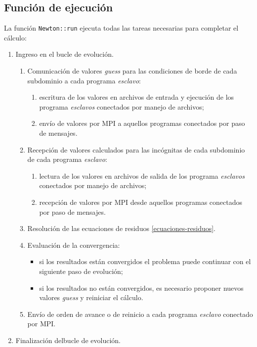 \subsection*{Función de ejecución}
\label{ap2:newton-run}

La función \texttt{Newton::run} ejecuta todas las tareas necesarias para completar el cálculo:
\begin{enumerate}
\item Ingreso en el bucle de evolución.
  \begin{enumerate}
  \item Comunicación de valores \textit{guess} para las condiciones de borde de cada subdominio a cada programa \textit{esclavo}:
    \begin{enumerate}
    \item escritura de los valores en archivos de entrada y ejecución de los programa \textit{esclavos} conectados por manejo de archivos;
    \item envío de valores por MPI a aquellos programas conectados por paso de mensajes.
    \end{enumerate}
  \item Recepción de valores calculados para las incógnitas de cada subdominio de cada programa \textit{esclavo}:
    \begin{enumerate}
    \item lectura de los valores en archivos de salida de los programa \textit{esclavos} conectados por manejo de archivos;
    \item recepción de valores por MPI desde aquellos programas conectados por paso de mensajes.
    \end{enumerate}
  \item Resolución de las ecuaciones de residuos \ref{ecuaciones-residuos}.
  \item Evaluación de la convergencia:
  \begin{itemize}
  \item si los resultados están convergidos el problema puede continuar con el siguiente paso de evolución;
  \item si los resultados no están convergidos, es necesario proponer nuevos valores \textit{guess} y reiniciar el cálculo.
  \end{itemize}
  \item Envío de orden de avance o de reinicio a cada programa \textit{esclavo} conectado por MPI.
  \end{enumerate}
\item Finalización delbucle de evolución.
\end{enumerate}

